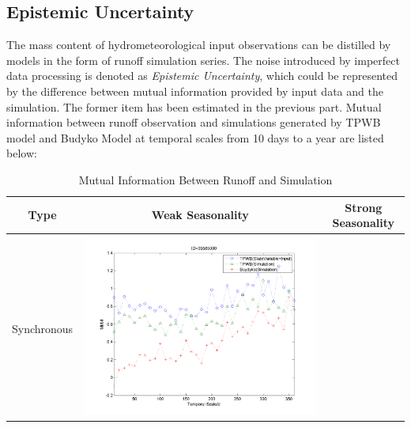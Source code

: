 \documentclass[11pt]{article}
\begin{document}
\fi
\subsection{Epistemic Uncertainty}

The mass content of hydrometeorological input observations can be distilled by models in the form of runoff simulation series. The noise introduced by imperfect data processing is denoted as \emph{Epistemic Uncertainty}, which could be represented by the difference between  mutual information provided by input data and  the simulation. The former item has been estimated in the previous part. Mutual information between runoff observation and simulations  generated by TPWB model and Budyko Model at temporal scales from 10 days to a year are listed below:
\begin{table}[H]\small
\caption{Mutual Information Between Runoff and Simulation}
\label{sm}
\resizebox{\textwidth}{!}
{
\centering
\begin{tabular}{ccc}
\toprule
Type& Weak Seasonality & Strong Seasonality \\\hline
\\
Synchronous
&\begin{minipage}{.6\textwidth}\includegraphics[width=\linewidth]{resultgraph/05585000MI.png}\end{minipage}


\end{tabular}}
\end{table}
\end{document}
